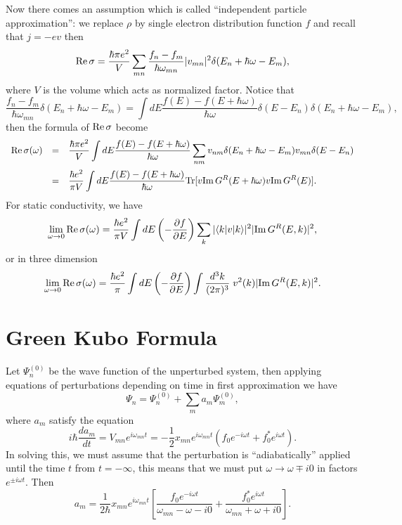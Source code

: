 \documentclass{book}
\newcommand{\bra}[1]{{\langle#1|}}
\newcommand{\ket}[1]{{|#1\rangle}}
\renewcommand{\Re}{{\rm Re}}
\renewcommand{\Im}{{\rm Im}}
\newcommand{\Tr}{{\rm Tr}}
\numberwithin{equation}{section}
\begin{document}
Now there comes an assumption which is called ``independent particle
approximation'': we replace $\rho$ by single electron distribution
function $f$ and recall that $j=-ev$ then
\begin{equation}
  \Re\,\sigma=\frac{\hbar\pi e^2}{V}\sum_{mn}
  \frac{f_n-f_m}{\hbar\omega_{mn}}|v_{mn}|^2\delta(E_n+\hbar\omega-E_m),
\end{equation}
where $V$ is the volume which acts as normalized factor.
Notice that 
\begin{equation}
  \frac{f_n-f_m}{\hbar\omega_{mn}}\delta(E_n+\hbar\omega-E_m)=
  \int dE\frac{f(E)-f(E+\hbar\omega)}{\hbar\omega}
  \delta(E-E_n)\delta(E_n+\hbar\omega-E_m),
\end{equation}
then the formula of $\Re\,\sigma$ become
\begin{equation}
  \begin{array}{rcl}
    \Re\,\sigma(\omega)&=&\displaystyle\frac{\hbar\pi e^2}{V} \int
    dE\frac{f(E)-f(E+\hbar\omega)}{\hbar\omega}\sum_{nm}
    v_{nm}\delta(E_n+\hbar\omega-E_m)v_{mn}\delta(E-E_n)\\\vbox to
    20pt{} &=&\displaystyle\frac{\hbar e^2}{\pi V}\int dE
    \frac{f(E)-f(E+\hbar\omega)}{\hbar\omega}
    \Tr[v\Im\,G^R(E+\hbar\omega)v\Im\,G^R(E)].
  \end{array}
\end{equation}
For static conductivity, we have
\begin{equation}
  \lim_{\omega\to0}\Re\,\sigma(\omega)=
  \frac{\hbar e^2}{\pi V}\int dE
  \left(-\frac{\partial f}{\partial E}\right)
  \sum_k|\bra{k}v\ket{k}|^2|\Im\,G^R(E,k)|^2,
\end{equation}
or in three dimension
\begin{equation}
  \lim_{\omega\to0}\Re\,\sigma(\omega)=
  \frac{\hbar e^2}{\pi}\int dE
  \left(-\frac{\partial f}{\partial E}\right)
  \int \frac{d^3k}{(2\pi)^3}\; v^2(k)|\Im\,G^R(E,k)|^2.
\end{equation}

\section{Green Kubo Formula}
Let $\Psi^{(0)}_n$ be the wave function of the unperturbed system,
then applying equations of perturbations depending on time in first
approximation we have
\begin{equation}
  \Psi_n=\Psi^{(0)}_n+\sum_ma_{m}\Psi^{(0)}_m,
\end{equation}
where $a_m$ satisfy the equation
\begin{equation}
  i\hbar\frac{da_m}{dt}=V_{mn}e^{i\omega_{mn}t}=-\frac{1}{2}
  x_{mn}e^{i\omega_{mn}t}(f_0e^{-i\omega t}+f_0^*e^{i\omega t}).
\end{equation}
In solving this, we must assume that the perturbation is ``adiabatically''
applied until the time $t$ from $t=-\infty$, this means that we must put
$\omega\to\omega\mp i0$ in factors $e^{\pm i\omega t}$. Then
\begin{equation}
  a_m=\frac{1}{2\hbar}x_{mn}e^{i\omega_{mn}t}\left[
    \frac{f_0e^{-i\omega t}}{\omega_{mn}-\omega-i0}+
    \frac{f_0^*e^{i\omega t}}{\omega_{mn}+\omega+i0}\right].
\end{equation}
\end{document}
